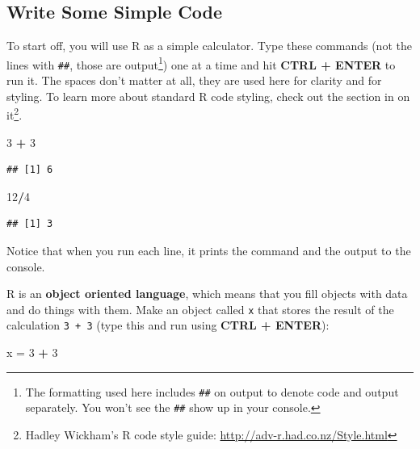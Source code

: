 \documentclass[]{book}
\newenvironment{Shaded}{\begin{snugshade}}{\end{snugshade}}
\newcommand{\DecValTok}[1]{\textcolor[rgb]{0.00,0.00,0.81}{#1}}
\newcommand{\NormalTok}[1]{#1}
\newcommand{\OperatorTok}[1]{\textcolor[rgb]{0.81,0.36,0.00}{\textbf{#1}}}
\newcommand{\StringTok}[1]{\textcolor[rgb]{0.31,0.60,0.02}{#1}}
\let\rmarkdownfootnote\footnote%
\def\footnote{\protect\rmarkdownfootnote}
\begin{document}
\hypertarget{write-some-simple-code}{%
\subsection{Write Some Simple Code}\label{write-some-simple-code}}

To start off, you will use R as a simple calculator. Type these commands (not the lines with \texttt{\#\#}, those are output\footnote{The formatting used here includes \texttt{\#\#} on output to denote code and output separately. You won't see the \texttt{\#\#} show up in your console.}) one at a time and hit \textbf{CTRL + ENTER} to run it. The spaces don't matter at all, they are used here for clarity and for styling. To learn more about standard R code styling, check out the section in \citet{adv-r-cite} on it\footnote{Hadley Wickham's R code style guide: \url{http://adv-r.had.co.nz/Style.html}}.

\begin{Shaded}
\begin{Highlighting}[]
\DecValTok{3} \OperatorTok{+}\StringTok{ }\DecValTok{3}
\end{Highlighting}
\end{Shaded}

\begin{verbatim}
## [1] 6
\end{verbatim}

\begin{Shaded}
\begin{Highlighting}[]
\DecValTok{12}\OperatorTok{/}\DecValTok{4}
\end{Highlighting}
\end{Shaded}

\begin{verbatim}
## [1] 3
\end{verbatim}

Notice that when you run each line, it prints the command and the output to the console.

R is an \textbf{object oriented language}, which means that you fill objects with data and do things with them. Make an object called \texttt{x} that stores the result of the calculation \texttt{3\ +\ 3} (type this and run using \textbf{CTRL + ENTER}):

\begin{Shaded}
\begin{Highlighting}[]
\NormalTok{x =}\StringTok{ }\DecValTok{3} \OperatorTok{+}\StringTok{ }\DecValTok{3}
\end{Highlighting}
\end{Shaded}
\end{document}
